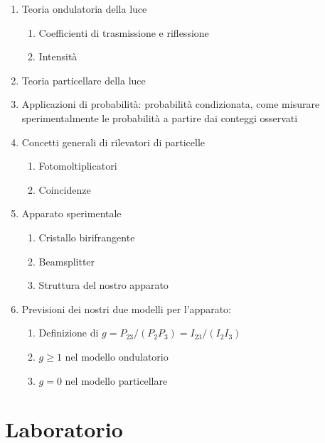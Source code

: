 \documentclass{article}
\begin{document}
\begin{enumerate}
    \item Teoria ondulatoria della luce
    \begin{enumerate}
        \item Coefficienti di trasmissione e riflessione
        \item Intensità
    \end{enumerate}
    \item Teoria particellare della luce
    \item Applicazioni di probabilità: probabilità condizionata, come misurare sperimentalmente le probabilità a partire dai conteggi osservati
    \item Concetti generali di rilevatori di particelle
    \begin{enumerate}
        \item Fotomoltiplicatori
        \item Coincidenze
    \end{enumerate}
    \item Apparato sperimentale
    \begin{enumerate}
        \item Cristallo birifrangente
        \item Beamsplitter
        \item Struttura del nostro apparato
    \end{enumerate}
    \item Previsioni dei nostri due modelli per l'apparato:
    \begin{enumerate}
        \item Definizione di \(g = P_{23}/(P_2 P_3) = I_{23}/(I_2 I_3)\)
        \item \(g \geq 1\) nel modello ondulatorio
        \item \(g = 0\) nel modello particellare
    \end{enumerate}
\end{enumerate}

\section{Laboratorio}
\end{document}
